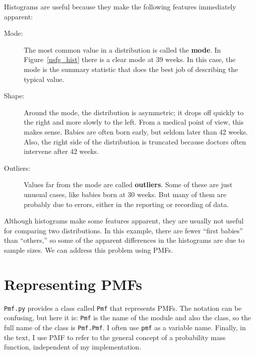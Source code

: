 \documentclass[12pt]{book}
\begin{document}
Histograms are useful because they make the following features immediately
apparent:

\begin{description}

\item[Mode:] The most common value in a distribution is called the
  {\bf mode}.  In Figure~\ref{nsfg_hist} there is a clear mode at 39
  weeks.  In this case, the mode is the summary statistic that does
  the best job of describing the typical value.


\item[Shape:] Around the mode, the distribution is asymmetric; it
  drops off quickly to the right and more slowly to the left.  From a
  medical point of view, this makes sense.  Babies are often born
  early, but seldom later than 42 weeks.  Also, the right side of the
  distribution is truncated because doctors often intervene after 42
  weeks.


\item[Outliers:] Values far from the mode are called {\bf outliers}.
  Some of these are just unusual cases, like babies born at 30 weeks.
  But many of them are probably due to errors, either in the reporting
  or recording of data.


\end{description}

Although histograms make some features apparent, they are usually not
useful for comparing two distributions.  In this example, there are
fewer ``first babies'' than ``others,'' so some of the apparent
differences in the histograms are due to sample sizes.  We can
address this problem using PMFs.


\section{Representing PMFs}


{\tt Pmf.py} provides a class called {\tt Pmf} that represents PMFs.
The notation can be confusing, but here it is: {\tt Pmf} is the
name of the module and also the class, so the full name of the class
is {\tt Pmf.Pmf}.  I often use {\tt pmf} as a variable name.
Finally, in the text, I use PMF to refer to the general concept
of a probability mass function, independent of my implementation.
\end{document}
